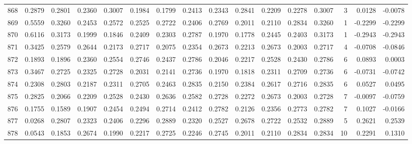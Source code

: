 \begin{tabular}{lrrrrrrrrrrrrrrr}
868 &      0.2879 &  0.2801 &  0.2360 &  0.3007 &  0.1984 &  0.1799 &  0.2413 &  0.2343 &  0.2841 &  0.2209 &   0.2278 &     0.3007 &      3 &                    0.0128 &                    -0.0078 \\
869 &      0.5559 &  0.3260 &  0.2453 &  0.2572 &  0.2525 &  0.2722 &  0.2406 &  0.2769 &  0.2011 &  0.2110 &   0.2834 &     0.3260 &      1 &                   -0.2299 &                    -0.2299 \\
870 &      0.6116 &  0.3173 &  0.1999 &  0.1846 &  0.2409 &  0.2303 &  0.2787 &  0.1970 &  0.1778 &  0.2445 &   0.2403 &     0.3173 &      1 &                   -0.2943 &                    -0.2943 \\
871 &      0.3425 &  0.2579 &  0.2644 &  0.2173 &  0.2717 &  0.2075 &  0.2354 &  0.2673 &  0.2213 &  0.2673 &   0.2003 &     0.2717 &      4 &                   -0.0708 &                    -0.0846 \\
872 &      0.1893 &  0.1896 &  0.2360 &  0.2554 &  0.2746 &  0.2437 &  0.2786 &  0.2046 &  0.2217 &  0.2528 &   0.2430 &     0.2786 &      6 &                    0.0893 &                     0.0003 \\
873 &      0.3467 &  0.2725 &  0.2325 &  0.2728 &  0.2031 &  0.2141 &  0.2736 &  0.1970 &  0.1818 &  0.2311 &   0.2709 &     0.2736 &      6 &                   -0.0731 &                    -0.0742 \\
874 &      0.2308 &  0.2803 &  0.2187 &  0.2311 &  0.2705 &  0.2463 &  0.2835 &  0.2150 &  0.2384 &  0.2617 &   0.2716 &     0.2835 &      6 &                    0.0527 &                     0.0495 \\
875 &      0.2825 &  0.2066 &  0.2209 &  0.2528 &  0.2430 &  0.2636 &  0.2582 &  0.2728 &  0.2272 &  0.2673 &   0.2003 &     0.2728 &      7 &                   -0.0097 &                    -0.0759 \\
876 &      0.1755 &  0.1589 &  0.1907 &  0.2454 &  0.2494 &  0.2714 &  0.2412 &  0.2782 &  0.2126 &  0.2356 &   0.2773 &     0.2782 &      7 &                    0.1027 &                    -0.0166 \\
877 &      0.0268 &  0.2807 &  0.2323 &  0.2406 &  0.2296 &  0.2889 &  0.2320 &  0.2527 &  0.2678 &  0.2722 &   0.2532 &     0.2889 &      5 &                    0.2621 &                     0.2539 \\
878 &      0.0543 &  0.1853 &  0.2674 &  0.1990 &  0.2217 &  0.2725 &  0.2246 &  0.2745 &  0.2011 &  0.2110 &   0.2834 &     0.2834 &     10 &                    0.2291 &                     0.1310 \\

\end{tabular}
